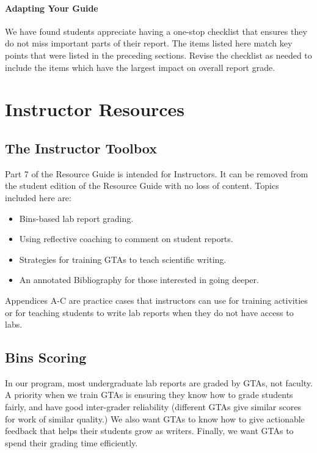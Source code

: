 \documentclass[
]{book}
\providecommand{\tightlist}{%
  \setlength{\itemsep}{0pt}\setlength{\parskip}{0pt}}
\begin{document}
\hypertarget{adapting-your-guide-5}{%
\subsection{Adapting Your Guide}\label{adapting-your-guide-5}}

We have found students appreciate having a one-stop checklist that ensures they do not miss important parts of their report. The items listed here match key points that were listed in the preceding sections. Revise the checklist as needed to include the items which have the largest impact on overall report grade.

\hypertarget{part-instructor-resources}{%
\part{Instructor Resources}\label{part-instructor-resources}}

\hypertarget{teachertools700}{%
\chapter{The Instructor Toolbox}\label{teachertools700}}

Part 7 of the Resource Guide is intended for Instructors. It can be removed from the student edition of the Resource Guide with no loss of content. Topics included here are:

\begin{itemize}
\tightlist
\item
  Bins-based lab report grading.
\item
  Using reflective coaching to comment on student reports.
\item
  Strategies for training GTAs to teach scientific writing.
\item
  An annotated Bibliography for those interested in going deeper.
\end{itemize}

Appendices A-C are practice cases that instructors can use for training activities or for teaching students to write lab reports when they do not have access to labs.

\hypertarget{binsscore705}{%
\chapter{Bins Scoring}\label{binsscore705}}

In our program, most undergraduate lab reports are graded by GTAs, not faculty. A priority when we train GTAs is ensuring they know how to grade students fairly, and have good inter-grader reliability (different GTAs give similar scores for work of similar quality.) We also want GTAs to know how to give actionable feedback that helps their students grow as writers. Finally, we want GTAs to spend their grading time efficiently.
\end{document}
